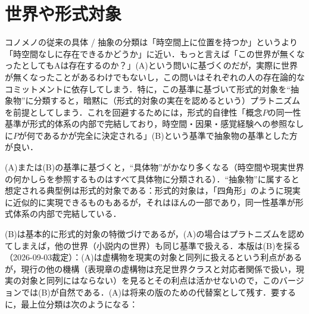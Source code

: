 \documentclass[../../main-detail.tex]{subfiles}
\begin{document}
\section{世界や形式対象} コノメノの従来の具体 / 抽象の分類は「時空間上に位置を持つか」というより「時空間なしに存在できるかどうか」に近い．もっと言えば「この世界が無くなったとしてもAは存在するのか？」(A)という問いに基づくのだが，実際に世界が無くなったことがあるわけでもないし，この問いはそれぞれの人の存在論的なコミットメントに依存してしまう．特に，この基準に基づいて形式的対象を``抽象物''に分類すると，暗黙に（形式的対象の実在を認めるという）プラトニズムを前提としてしまう．これを回避するためには，形式的自律性「概念$P$の同一性基準が形式的体系の内部で完結しており，時空間・因果・感覚経験への参照なしに$P$が何であるかが完全に決定される」(B)という基準で抽象物の基準とした方が良い．

(A)または(B)の基準に基づくと，``具体物''がかなり多くなる（時空間や現実世界の何かしらを参照するものはすべて具体物に分類される）．``抽象物''に属すると想定される典型例は形式的対象である：形式的対象は，「四角形」のように現実に近似的に実現できるものもあるが，それはほんの一部であり，同一性基準が形式体系の内部で完結している．

(B)は基本的に形式的対象の特徴づけであるが，(A)の場合はプラトニズムを認めてしまえば，他の世界（小説内の世界）も同じ基準で扱える．本版は(B)を採る（2026-09-03裁定）：(A)は虚構物を現実の対象と同列に扱えるという利点があるが，現行の他の機構（表現章の虚構物は充足世界クラスと対応者関係で扱い，現実の対象と同列にはならない）を見るとその利点は活かせないので，このバージョンでは(B)が自然である．(A)は将来の版のための代替案として残す．要するに，最上位分類は次のようになる：
\end{document}
